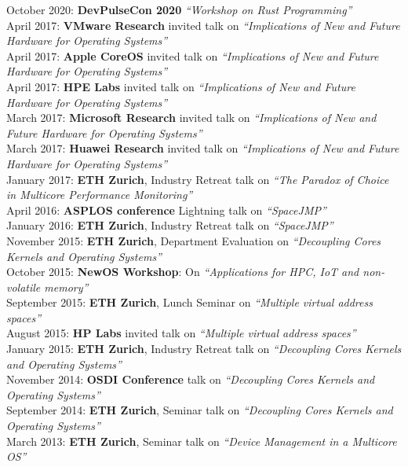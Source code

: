 \documentclass[margin,line]{cv/cv}
\begin{document}
\begin{resume}
    October 2020: \textbf{DevPulseCon 2020} \textit{``Workshop on Rust Programming''}\\
    April 2017: \textbf{VMware Research} invited talk on \textit{``Implications of New and Future Hardware for Operating Systems''}\\
    April 2017: \textbf{Apple CoreOS} invited talk on \textit{``Implications of New and Future Hardware for Operating Systems''}\\
    April 2017: \textbf{HPE Labs} invited talk on \textit{``Implications of New and Future Hardware for Operating Systems''}\\
    March 2017: \textbf{Microsoft Research} invited talk on \textit{``Implications of New and Future Hardware for Operating Systems''}\\
    March 2017: \textbf{Huawei Research} invited talk on \textit{``Implications of New and Future Hardware for Operating Systems''}\\
    January 2017: \textbf{ETH Zurich}, Industry Retreat talk on \textit{``The Paradox of Choice in Multicore Performance Monitoring''}\\
    April 2016: \textbf{ASPLOS conference} Lightning talk on \textit{``SpaceJMP''}\\
    January 2016: \textbf{ETH Zurich}, Industry Retreat talk on \textit{``SpaceJMP''}\\
    November 2015: \textbf{ETH Zurich}, Department Evaluation on \textit{``Decoupling Cores Kernels and Operating Systems''}\\
    October 2015: \textbf{NewOS Workshop}: On \textit{``Applications for HPC, IoT and non-volatile memory''}\\
    September 2015: \textbf{ETH Zurich}, Lunch Seminar on \textit{``Multiple virtual address spaces''}\\
    August 2015: \textbf{HP Labs} invited talk on \textit{``Multiple virtual address spaces''}\\
    January 2015: \textbf{ETH Zurich}, Industry Retreat talk on \textit{``Decoupling Cores Kernels and Operating Systems''}\\
    November 2014: \textbf{OSDI Conference} talk on \textit{``Decoupling Cores Kernels and Operating Systems''}\\
    September 2014: \textbf{ETH Zurich}, Seminar talk on \textit{``Decoupling Cores Kernels and Operating Systems''}\\
    March 2013: \textbf{ETH Zurich}, Seminar talk on \textit{``Device Management in a Multicore OS''}\\


\end{resume}
\end{document}
